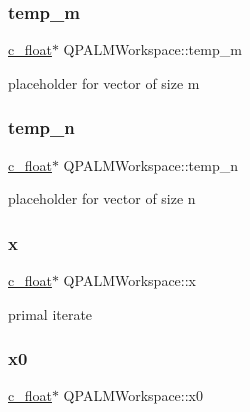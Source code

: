 \subsubsection{\texorpdfstring{temp\_m}{temp\_m}}
{\footnotesize\ttfamily \mbox{\hyperlink{global__opts_8h_a7f1a9fda95e52979658c20a0d134fb15}{c\+\_\+float}}$\ast$ Q\+P\+A\+L\+M\+Workspace\+::temp\+\_\+m}



placeholder for vector of size m 

\mbox{\label{structQPALMWorkspace_af54ff24e9b647dd2d8e8df2b89c11946}} 
\subsubsection{\texorpdfstring{temp\_n}{temp\_n}}
{\footnotesize\ttfamily \mbox{\hyperlink{global__opts_8h_a7f1a9fda95e52979658c20a0d134fb15}{c\+\_\+float}}$\ast$ Q\+P\+A\+L\+M\+Workspace\+::temp\+\_\+n}



placeholder for vector of size n 

\mbox{\label{structQPALMWorkspace_a0625a9b426e5e7d81443a107d49730ef}} 
\subsubsection{\texorpdfstring{x}{x}}
{\footnotesize\ttfamily \mbox{\hyperlink{global__opts_8h_a7f1a9fda95e52979658c20a0d134fb15}{c\+\_\+float}}$\ast$ Q\+P\+A\+L\+M\+Workspace\+::x}



primal iterate 

\mbox{\label{structQPALMWorkspace_aa9dafcb9c277f81bb5e6cc5e514e4a51}} 
\subsubsection{\texorpdfstring{x0}{x0}}
{\footnotesize\ttfamily \mbox{\hyperlink{global__opts_8h_a7f1a9fda95e52979658c20a0d134fb15}{c\+\_\+float}}$\ast$ Q\+P\+A\+L\+M\+Workspace\+::x0}



